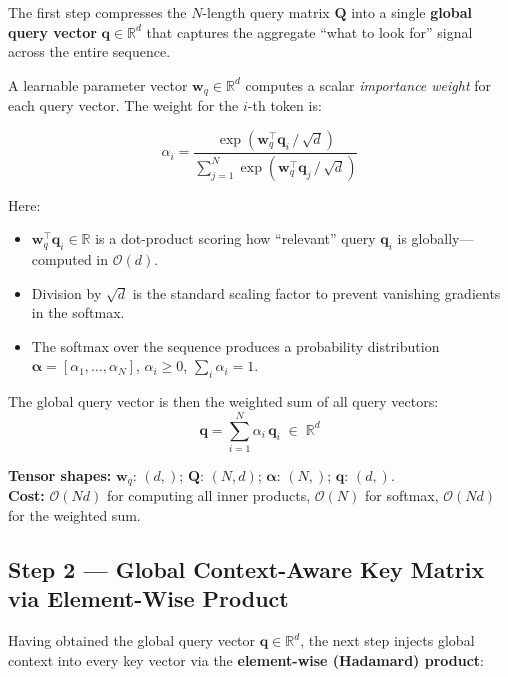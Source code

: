 \documentclass[11pt,a4paper]{article}
\newcommand{\mat}[1]{\mathbf{#1}}
\newcommand{\vect}[1]{\mathbf{#1}}
\newcommand{\R}{\mathbb{R}}
\theoremstyle{definition}
\begin{document}
The first step compresses the $N$-length query matrix $\mat{Q}$ into a single
\textbf{global query vector} $\vect{q}\in\R^{d}$ that captures the aggregate ``what to look
for'' signal across the entire sequence.

A learnable parameter vector $\vect{w}_{q}\in\R^{d}$ computes a scalar \emph{importance
weight} for each query vector.
The weight for the $i$-th token is:

\begin{equation*}
  \alpha_i =
  \frac{\exp\!\left(\vect{w}_{q}^{\top}\vect{q}_i\,/\,\sqrt{d}\right)}
       {\displaystyle\sum_{j=1}^{N}\exp\!\left(\vect{w}_{q}^{\top}\vect{q}_j\,/\,\sqrt{d}\right)}
\end{equation*}

\noindent Here:
\begin{itemize}[noitemsep]
  \item $\vect{w}_{q}^{\top}\vect{q}_i \in \R$ is a dot-product scoring how ``relevant'' query
        $\vect{q}_i$ is globally---computed in $\mathcal{O}(d)$.
  \item Division by $\sqrt{d}$ is the standard scaling factor to prevent vanishing gradients
        in the softmax.
  \item The softmax over the sequence produces a probability distribution
        $\bm{\alpha}=[\alpha_1,\ldots,\alpha_N]$, $\alpha_i\geq0$, $\sum_i\alpha_i=1$.
\end{itemize}

The global query vector is then the weighted sum of all query vectors:
\begin{equation*}
  \vect{q} = \sum_{i=1}^{N}\alpha_i\,\vect{q}_i \;\in\; \R^{d}
\end{equation*}

\noindent \textbf{Tensor shapes:} $\vect{w}_{q}:\,(d,)$;\; $\mat{Q}:\,(N,d)$;\;
$\bm{\alpha}:\,(N,)$;\; $\vect{q}:\,(d,)$.\\
\textbf{Cost:} $\mathcal{O}(Nd)$ for computing all inner products, $\mathcal{O}(N)$ for
softmax, $\mathcal{O}(Nd)$ for the weighted sum.


\subsection{Step 2 --- Global Context-Aware Key Matrix via Element-Wise Product}
\label{sec:key_interaction}

Having obtained the global query vector $\vect{q}\in\R^{d}$, the next step injects global
context into every key vector via the \textbf{element-wise (Hadamard) product}:
\end{document}
